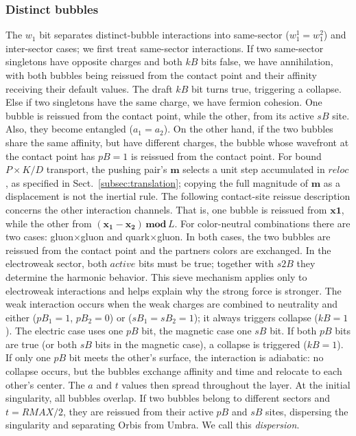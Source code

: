 \documentclass{ijuc}
\begin{document}
\subsubsection{Distinct bubbles} \label{subsec:distinct}
The $w_1$ bit separates distinct-bubble interactions into same-sector ($w_1^1=w_1^2$) and inter-sector cases; we first treat same-sector interactions.
If two same-sector singletons have opposite charges and both $kB$ bits false, we have annihilation, with both bubbles being reissued from the contact point and their affinity receiving their default values. The draft $kB$ bit turns true, triggering a collapse.
Else if two singletons have the same charge, we have fermion cohesion.
One bubble is reissued from the contact point, while the other, from its active $sB$ site.
Also, they become entangled ($a_1=a_2$).
On the other hand, if the two bubbles share the same affinity, but have different charges, the bubble whose wavefront at the contact point has $pB=1$ is reissued from the contact point.
For bound $P\times K/D$ transport, the pushing pair's $\boldsymbol{m}$ selects a unit step accumulated in $\boldsymbol{\mathit{reloc}}$, as specified in Sect.~\ref{subsec:translation}; copying the full magnitude of $\boldsymbol{m}$ as a displacement is not the inertial rule. The following contact-site reissue description concerns the other interaction channels.
That is, one bubble is reissued from $\boldsymbol{x1}$, while the other from $(\boldsymbol{x_1}-\boldsymbol{x_2})\,\boldsymbol{mod}\,L$.
For color-neutral combinations there are two cases: gluon$\times$gluon and quark$\times$gluon.
In both cases, the two bubbles are reissued from the contact point and the partners colors are exchanged.
In the electroweak sector, both $\mathit{active}$ bits must be true; together with $s2B$ they determine the harmonic behavior. This sieve mechanism applies only to electroweak interactions and helps explain why the strong force is stronger.
The weak interaction occurs when the weak charges are combined to neutrality and either ($pB_1=1$, $pB_2=0$) or ($sB_1=sB_2=1$); it always triggers collapse ($kB=1$).
The electric case uses one $pB$ bit, the magnetic case one $sB$ bit. If both $pB$ bits are true (or both $sB$ bits in the magnetic case), a collapse is triggered ($kB=1$).
If only one $pB$ bit meets the other's surface, the interaction is adiabatic: no collapse occurs, but the bubbles exchange affinity and time and relocate to each other's center. The $a$ and $t$ values then spread throughout the layer.
At the initial singularity, all bubbles overlap. If two bubbles belong to different sectors and $t=RMAX/2$, they are reissued from their active $pB$ and $sB$ sites, dispersing the singularity and separating Orbis from Umbra. We call this \textit{dispersion}.
\end{document}

